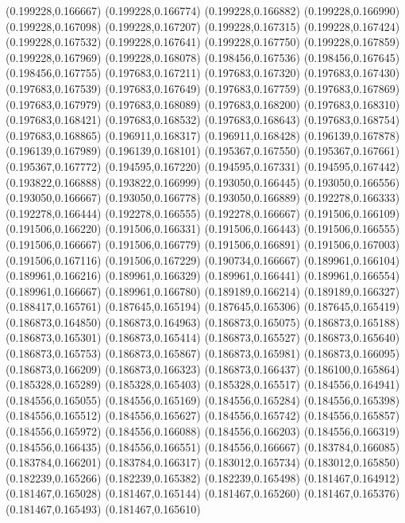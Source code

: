 (0.199228,0.166667)
(0.199228,0.166774)
(0.199228,0.166882)
(0.199228,0.166990)
(0.199228,0.167098)
(0.199228,0.167207)
(0.199228,0.167315)
(0.199228,0.167424)
(0.199228,0.167532)
(0.199228,0.167641)
(0.199228,0.167750)
(0.199228,0.167859)
(0.199228,0.167969)
(0.199228,0.168078)
(0.198456,0.167536)
(0.198456,0.167645)
(0.198456,0.167755)
(0.197683,0.167211)
(0.197683,0.167320)
(0.197683,0.167430)
(0.197683,0.167539)
(0.197683,0.167649)
(0.197683,0.167759)
(0.197683,0.167869)
(0.197683,0.167979)
(0.197683,0.168089)
(0.197683,0.168200)
(0.197683,0.168310)
(0.197683,0.168421)
(0.197683,0.168532)
(0.197683,0.168643)
(0.197683,0.168754)
(0.197683,0.168865)
(0.196911,0.168317)
(0.196911,0.168428)
(0.196139,0.167878)
(0.196139,0.167989)
(0.196139,0.168101)
(0.195367,0.167550)
(0.195367,0.167661)
(0.195367,0.167772)
(0.194595,0.167220)
(0.194595,0.167331)
(0.194595,0.167442)
(0.193822,0.166888)
(0.193822,0.166999)
(0.193050,0.166445)
(0.193050,0.166556)
(0.193050,0.166667)
(0.193050,0.166778)
(0.193050,0.166889)
(0.192278,0.166333)
(0.192278,0.166444)
(0.192278,0.166555)
(0.192278,0.166667)
(0.191506,0.166109)
(0.191506,0.166220)
(0.191506,0.166331)
(0.191506,0.166443)
(0.191506,0.166555)
(0.191506,0.166667)
(0.191506,0.166779)
(0.191506,0.166891)
(0.191506,0.167003)
(0.191506,0.167116)
(0.191506,0.167229)
(0.190734,0.166667)
(0.189961,0.166104)
(0.189961,0.166216)
(0.189961,0.166329)
(0.189961,0.166441)
(0.189961,0.166554)
(0.189961,0.166667)
(0.189961,0.166780)
(0.189189,0.166214)
(0.189189,0.166327)
(0.188417,0.165761)
(0.187645,0.165194)
(0.187645,0.165306)
(0.187645,0.165419)
(0.186873,0.164850)
(0.186873,0.164963)
(0.186873,0.165075)
(0.186873,0.165188)
(0.186873,0.165301)
(0.186873,0.165414)
(0.186873,0.165527)
(0.186873,0.165640)
(0.186873,0.165753)
(0.186873,0.165867)
(0.186873,0.165981)
(0.186873,0.166095)
(0.186873,0.166209)
(0.186873,0.166323)
(0.186873,0.166437)
(0.186100,0.165864)
(0.185328,0.165289)
(0.185328,0.165403)
(0.185328,0.165517)
(0.184556,0.164941)
(0.184556,0.165055)
(0.184556,0.165169)
(0.184556,0.165284)
(0.184556,0.165398)
(0.184556,0.165512)
(0.184556,0.165627)
(0.184556,0.165742)
(0.184556,0.165857)
(0.184556,0.165972)
(0.184556,0.166088)
(0.184556,0.166203)
(0.184556,0.166319)
(0.184556,0.166435)
(0.184556,0.166551)
(0.184556,0.166667)
(0.183784,0.166085)
(0.183784,0.166201)
(0.183784,0.166317)
(0.183012,0.165734)
(0.183012,0.165850)
(0.182239,0.165266)
(0.182239,0.165382)
(0.182239,0.165498)
(0.181467,0.164912)
(0.181467,0.165028)
(0.181467,0.165144)
(0.181467,0.165260)
(0.181467,0.165376)
(0.181467,0.165493)
(0.181467,0.165610)
